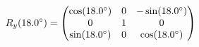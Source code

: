 \documentclass[preview]{standalone}
\begin{document}
\begin{align*}
\special{dvisvgm:raw <g id='unique000'>}R_y(18.0^\circ) = \begin{pmatrix} \cos(18.0^\circ) & 0 & -\sin(18.0^\circ) \\ 0 & 1 & 0 \\ \sin(18.0^\circ) & 0 & \cos(18.0^\circ) \end{pmatrix}\special{dvisvgm:raw </g>}
\end{align*}
\end{document}
